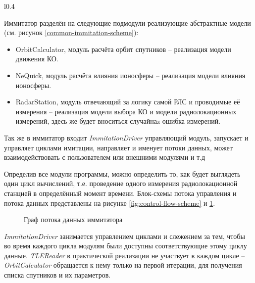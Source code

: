 \begin{wrapfigure}[25]{l}{0.4\textwidth}
	\begin{center}
		
	\end{center}
	\caption{Граф потока управления иммитатора} \label{fig:control-flow-scheme}
\end{wrapfigure}
Иммитатор разделён на следующие подмодули
реализующие абстрактные модели (см. рисунок \ref{common-immitation-scheme}):
\begin{itemize}
	\item OrbitCalculator, модуль расчёта орбит спутников -- реализация модели движения КО.
	\item NeQuick, модуль расчёта влияния ионосферы -- реализация модели влияния ионосферы.
	\item RadarStation, модуль отвечающий за логику самой РЛС и проводимые её измерения -- реализация модели выбора
			КО и модели радиолокационных измерений, здесь же будет вноситься случайнаz ошибка измерений.
\end{itemize}

Так же в иммитатор входит \textit{ImmitationDriver} управляющий модуль, запускает и управляет циклами имитации,
направляет и именует потоки данных, может взаимодействовать с пользователем или внешними модулями и т.д

Определив все модули программы, можно определить то, как будет выглядеть один цикл вычислений, т.е. проведение
одного измерения радиолокационной станцией в определённый момент времени. Блок-схемы потока управления и потока
данных представлены на рисунке \ref{fig:control-flow-scheme} и \ref{fig:data-flow-scheme}.
\begin{figure}[H]
	\centering
	
	\caption{Граф потока данных иммитатора} \label{fig:data-flow-scheme}
\end{figure}

\textit{ImmitationDriver} занимается управлением циклами и слежением за тем, чтобы во время каждого цикла модулям
были доступны соответствующие этому циклу данные. \textit{TLEReader} в практической реализации не участвует в каждом 
цикле -- \textit{OrbitCalculator} обращается к нему только на первой итерации, для получения списка спутников 
и их параметров.

